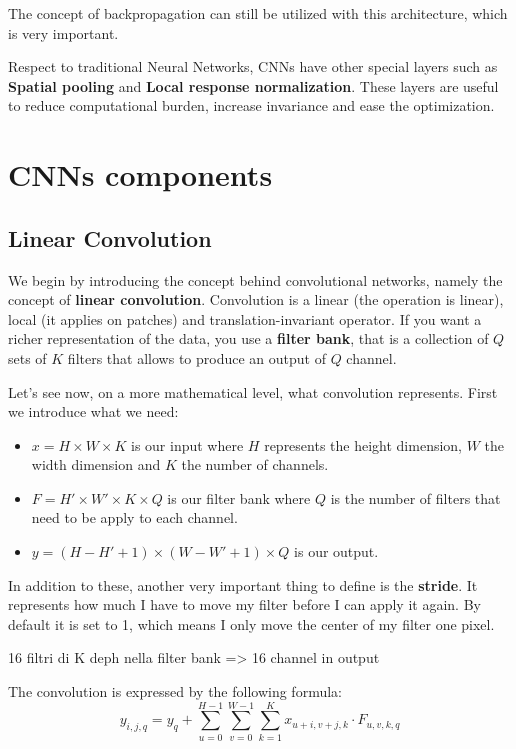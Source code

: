 The concept of backpropagation can still be utilized with this architecture, which is 
very important.

Respect to traditional Neural Networks, CNNs have other special layers such as \textbf{Spatial pooling} and \textbf{Local response normalization}. These layers are 
useful to reduce computational burden, increase invariance and ease the optimization.
\section{CNNs components}
\subsection{Linear Convolution}
We begin by introducing the concept behind convolutional networks, namely the concept 
of \textbf{linear convolution}. Convolution is a linear (the operation is linear), 
local (it applies on patches) and translation-invariant
operator. If you want a richer representation of the data, you use a \textbf{filter bank},
that is a collection of $Q$ sets of $K$ filters that allows to produce an output of 
$Q$ channel.

Let's see now, on a more mathematical level, what convolution represents. First we 
introduce what we need:
\begin{itemize}
    \item $x = H \times W \times K$ is our input where $H$ represents the height dimension, $W$ the width dimension and $K$ the number of channels.
    \item $F = H' \times W' \times K \times Q$ is our filter bank where $Q$ is the number of filters that need to be apply to each channel.
    \item $y = (H - H' + 1) \times (W - W' + 1) \times Q$ is our output.
\end{itemize}

In addition to these, another very important thing to define is the \textbf{stride}. 
It represents how much I have to move my filter before I can apply it again. By default 
it is set to 1, which means I only move the center of my filter one pixel. 

\begin{note}
    16 filtri di K deph nella filter bank => 16 channel in output
\end{note}

The convolution is expressed by the following formula:
\begin{equation}
    y_{i, j, q} = y_q + \sum_{u = 0}^{H - 1}\sum_{v = 0}^{W - 1}\sum_{k = 1}^{K} x_{u + i, v + j, k} \cdot F_{u, v, k, q} 
\end{equation}

